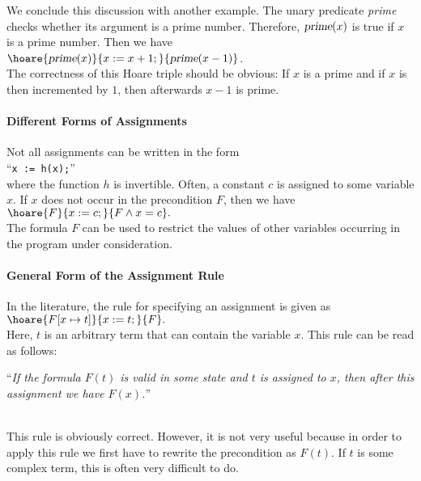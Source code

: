 We conclude this discussion with another example.  The unary predicate \textsl{prime} checks whether
its argument is a prime number.  Therefore, $\textsl{prime}(x)$ is true if $x$ is a prime number.
Then we have
\\[0.2cm]
\hspace*{1.3cm}
$\hoare{\textsl{prime}(x)}{x := x + 1;}{\textsl{prime}(x-1)}$.
\\[0.2cm]
The correctness of this Hoare triple should be obvious: If $x$ is a prime and if $x$ is then
incremented by $1$, then afterwards $x-1$ is prime.

\paragraph{Different Forms of Assignments}
Not all assignments can be written in the form
\\[0.2cm]
\hspace*{1.3cm}
 ``\texttt{x := h(x);}'' 
\\[0.2cm]
where the function $h$ is invertible.
Often, a constant $c$ is assigned to some variable $x$.  If $x$ does not occur in the precondition
$F$, then we have
\\[0.2cm]
\hspace*{1.3cm}
$ \hoare{F}{x := c;}{F \wedge x = c}. $
\\[0.2cm]
The formula $F$ can be used to restrict the values of other variables occurring in the program under
consideration.


\paragraph{General Form of the Assignment Rule}
In the literature, the rule for specifying an assignment is given as
\\[0.2cm]
\hspace*{1.3cm}
$ \hoare{F[x \mapsto t]}{x := t;}{F}. $
\\[0.2cm]
Here, $t$ is an arbitrary term that can contain the variable $x$.  This rule can be read as follows:
\\[0.2cm]
\hspace*{1.3cm}
\begin{minipage}[c]{0.8\linewidth}
``\emph{If the formula $F(t)$ is valid in some state and $t$ is assigned to $x$,
        then after this assignment we have $F(x)$.}'' 
\end{minipage}
\\[0.2cm]
This rule is obviously correct.  However, it is not very useful because in order to apply this rule 
we first have to rewrite the precondition as $F(t)$.  If $t$ is some complex term, this is often
very difficult to do.


